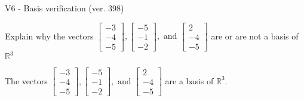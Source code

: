 \begin{exercise}
  \begin{exerciseTitle}V6 - Basis verification (ver. 398)\end{exerciseTitle}
  \begin{exerciseStatement}
    Explain why the vectors \(\left[\begin{array}{r}
-3 \\
-4 \\
-5
\end{array}\right] , \left[\begin{array}{r}
-5 \\
-1 \\
-2
\end{array}\right] , \text{ and } \left[\begin{array}{r}
2 \\
-4 \\
-5
\end{array}\right]\) are or are not a basis of \(\mathbb{R}^3\)	


  \end{exerciseStatement}
  \begin{exerciseAnswer}
   The vectors \(\left[\begin{array}{r}
-3 \\
-4 \\
-5
\end{array}\right] , \left[\begin{array}{r}
-5 \\
-1 \\
-2
\end{array}\right] , \text{ and } \left[\begin{array}{r}
2 \\
-4 \\
-5
\end{array}\right]\) 
  	 are  a basis of \(\mathbb{R}^3\).
  


  \end{exerciseAnswer}
\end{exercise}
